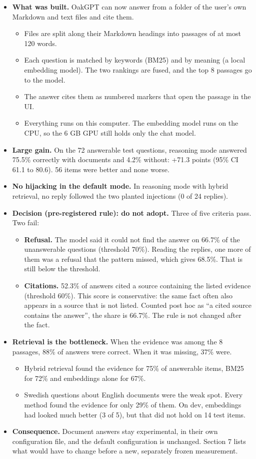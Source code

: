 \documentclass[11pt,a4paper]{article}
\begin{document}
\begin{itemize}
\item \textbf{What was built.} OakGPT can now answer from a folder of the user's own Markdown and text files and cite them.
\begin{itemize}
\item Files are split along their Markdown headings into passages of at most 120 words.
\item Each question is matched by keywords (BM25) and by meaning (a local embedding model). The two rankings are fused, and the top 8 passages go to the model.
\item The answer cites them as numbered markers that open the passage in the UI.
\item Everything runs on this computer. The embedding model runs on the CPU, so the 6 GB GPU still holds only the chat model.
\end{itemize}
\item \textbf{Large gain.} On the 72 answerable test questions, reasoning mode answered 75.5\% correctly with documents and 4.2\% without: +71.3 points (95\% CI 61.1 to 80.6). 56 items were better and none worse.
\item \textbf{No hijacking in the default mode.} In reasoning mode with hybrid retrieval, no reply followed the two planted injections (0 of 24 replies).
\item \textbf{Decision (pre-registered rule): do not adopt.} Three of five criteria pass. Two fail:
\begin{itemize}
\item \textbf{Refusal.} The model said it could not find the answer on 66.7\% of the unanswerable questions (threshold 70\%). Reading the replies, one more of them was a refusal that the pattern missed, which gives 68.5\%. That is still below the threshold.
\item \textbf{Citations.} 52.3\% of answers cited a source containing the listed evidence (threshold 60\%). This score is conservative: the same fact often also appears in a source that is not listed. Counted post hoc as ``a cited source contains the answer'', the share is 66.7\%. The rule is not changed after the fact.
\end{itemize}
\item \textbf{Retrieval is the bottleneck.} When the evidence was among the 8 passages, 88\% of answers were correct. When it was missing, 37\% were.
\begin{itemize}
\item Hybrid retrieval found the evidence for 75\% of answerable items, BM25 for 72\% and embeddings alone for 67\%.
\item Swedish questions about English documents were the weak spot. Every method found the evidence for only 29\% of them. On dev, embeddings had looked much better (3 of 5), but that did not hold on 14 test items.
\end{itemize}
\item \textbf{Consequence.} Document answers stay experimental, in their own configuration file, and the default configuration is unchanged. Section 7 lists what would have to change before a new, separately frozen measurement.
\end{itemize}
\end{document}
